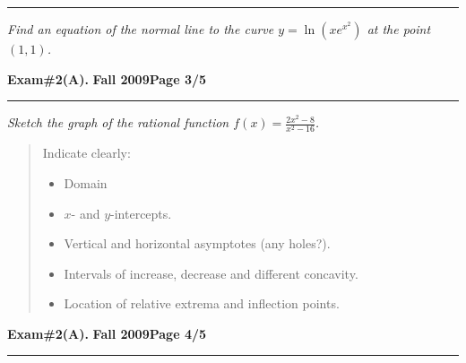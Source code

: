 \documentclass[12pt]{article}
\begin{document}
\vspace{4cm}
\vspace{5cm}

\hrule
{\problem[10 pts] \em Find an equation of the normal line to the
  curve $y=\ln(x e^{x^2})$ at the point $(1,1)$.} 
\newpage

\hfill{\large\bf Exam\#2(A).}\hfill{\large\bf
  Fall 2009}\hfill{\large\bf Page 3/5}\hrule

\bigskip
{\problem[30 pts] \em Sketch the graph of the rational function $f(x)
  = \displaystyle{\frac{2x^2-8}{x^2-16}}$.}
\begin{quotation}
Indicate clearly:
\begin{itemize}
\item Domain
\item $x$- and $y$-intercepts.
\item Vertical and horizontal asymptotes (any holes?).
\item Intervals of increase, decrease and different concavity.
\item Location of relative extrema and inflection points. 
\end{itemize}
\end{quotation}
\newpage

\hfill{\large\bf Exam\#2(A).}\hfill{\large\bf
  Fall 2009}\hfill{\large\bf Page 4/5}\hrule
\end{document}
